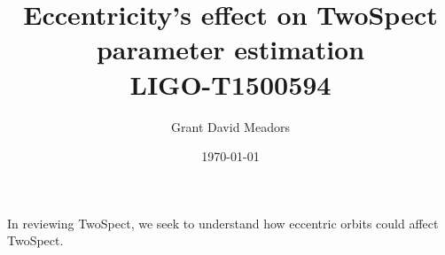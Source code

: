 \documentclass{report}
\begin{document}
\title{Eccentricity's effect on TwoSpect parameter estimation \\ 
LIGO-T1500594}
\author{Grant David Meadors}
\date{\today}

\maketitle

In reviewing TwoSpect, we seek to understand how eccentric orbits could affect TwoSpect.
\end{document}
